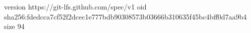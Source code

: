 version https://git-lfs.github.com/spec/v1
oid sha256:fdedcca7cf52f2dcec1e777bdb90308573b03666b310635f45bc4bff0d7aa9b4
size 94
